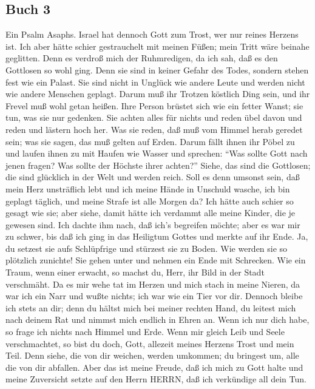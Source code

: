\hypertarget{buch-3}{%
\subsection{Buch 3}\label{buch-3}}

 Ein Psalm Asaphs. Israel hat dennoch Gott zum Trost, wer
nur reines Herzens ist.  Ich aber hätte schier gestrauchelt
mit meinen Füßen; mein Tritt wäre beinahe geglitten.  Denn
es verdroß mich der Ruhmredigen, da ich sah, daß es den Gottlosen so
wohl ging.  Denn sie sind in keiner Gefahr des Todes,
sondern stehen fest wie ein Palast.  Sie sind nicht in
Unglück wie andere Leute und werden nicht wie andere Menschen geplagt.
 Darum muß ihr Trotzen köstlich Ding sein, und ihr Frevel
muß wohl getan heißen.  Ihre Person brüstet sich wie ein
fetter Wanst; sie tun, was sie nur gedenken.  Sie achten
alles für nichts und reden übel davon und reden und lästern hoch her.
 Was sie reden, daß muß vom Himmel herab geredet sein; was
sie sagen, das muß gelten auf Erden.  Darum fällt ihnen ihr
Pöbel zu und laufen ihnen zu mit Haufen wie Wasser  und
sprechen: ``Was sollte Gott nach jenen fragen? Was sollte der Höchste
ihrer achten?''  Siehe, das sind die Gottlosen; die sind
glücklich in der Welt und werden reich.  Soll es denn
umsonst sein, daß mein Herz unsträflich lebt und ich meine Hände in
Unschuld wasche,  ich bin geplagt täglich, und meine Strafe
ist alle Morgen da?  Ich hätte auch schier so gesagt wie
sie; aber siehe, damit hätte ich verdammt alle meine Kinder, die je
gewesen sind.  Ich dachte ihm nach, daß ich's begreifen
möchte; aber es war mir zu schwer,  bis daß ich ging in das
Heiligtum Gottes und merkte auf ihr Ende.  Ja, du setzest
sie aufs Schlüpfrige und stürzest sie zu Boden.  Wie werden
sie so plötzlich zunichte! Sie gehen unter und nehmen ein Ende mit
Schrecken.  Wie ein Traum, wenn einer erwacht, so machst
du, Herr, ihr Bild in der Stadt verschmäht.  Da es mir wehe
tat im Herzen und mich stach in meine Nieren,  da war ich
ein Narr und wußte nichts; ich war wie ein Tier vor dir. 
Dennoch bleibe ich stets an dir; denn du hältst mich bei meiner rechten
Hand,  du leitest mich nach deinem Rat und nimmst mich
endlich in Ehren an.  Wenn ich nur dich habe, so frage ich
nichts nach Himmel und Erde.  Wenn mir gleich Leib und
Seele verschmachtet, so bist du doch, Gott, allezeit meines Herzens
Trost und mein Teil.  Denn siehe, die von dir weichen,
werden umkommen; du bringest um, alle die von dir abfallen.
 Aber das ist meine Freude, daß ich mich zu Gott halte und
meine Zuversicht setzte auf den Herrn HERRN, daß ich verkündige all dein
Tun.

